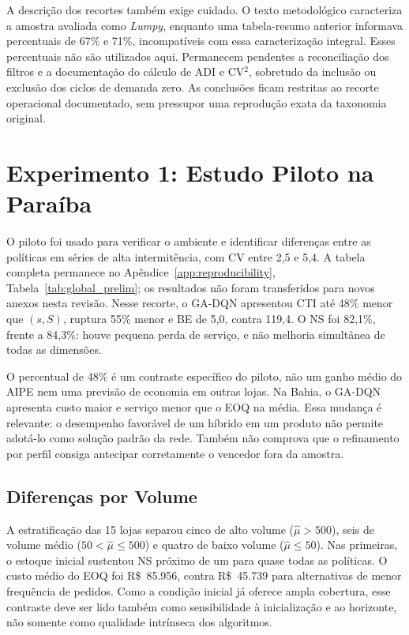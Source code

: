 A descrição dos recortes também exige cuidado. O texto metodológico caracteriza a amostra avaliada como \textit{Lumpy}, enquanto uma tabela-resumo anterior informava percentuais de 67\% e 71\%, incompatíveis com essa caracterização integral. Esses percentuais não são utilizados aqui. Permanecem pendentes a reconciliação dos filtros e a documentação do cálculo de ADI e CV$^2$, sobretudo da inclusão ou exclusão dos ciclos de demanda zero. As conclusões ficam restritas ao recorte operacional documentado, sem pressupor uma reprodução exata da taxonomia original.

\section{Experimento 1: Estudo Piloto na Paraíba}
\label{sec:experimento1}

O piloto foi usado para verificar o ambiente e identificar diferenças entre as políticas em séries de alta intermitência, com CV entre 2,5 e 5,4. A tabela completa permanece no Apêndice~\ref{app:reproducibility}, Tabela~\ref{tab:global_prelim}; os resultados não foram transferidos para novos anexos nesta revisão. Nesse recorte, o GA-DQN apresentou CTI até 48\% menor que $(s,S)$, ruptura 55\% menor e BE de 5,0, contra 119,4. O NS foi 82,1\%, frente a 84,3\%: houve pequena perda de serviço, e não melhoria simultânea de todas as dimensões.

O percentual de 48\% é um contraste específico do piloto, não um ganho médio do AIPE nem uma previsão de economia em outras lojas. Na Bahia, o GA-DQN apresenta custo maior e serviço menor que o EOQ na média. Essa mudança é relevante: o desempenho favorável de um híbrido em um produto não permite adotá-lo como solução padrão da rede. Também não comprova que o refinamento por perfil consiga antecipar corretamente o vencedor fora da amostra.

\subsection{Diferenças por Volume}

A estratificação das 15 lojas separou cinco de alto volume ($\hat\mu>500$), seis de volume médio ($50<\hat\mu\leq500$) e quatro de baixo volume ($\hat\mu\leq50$). Nas primeiras, o estoque inicial sustentou NS próximo de um para quase todas as políticas. O custo médio do EOQ foi R\$~85.956, contra R\$~45.739 para alternativas de menor frequência de pedidos. Como a condição inicial já oferece ampla cobertura, esse contraste deve ser lido também como sensibilidade à inicialização e ao horizonte, não somente como qualidade intrínseca dos algoritmos.

